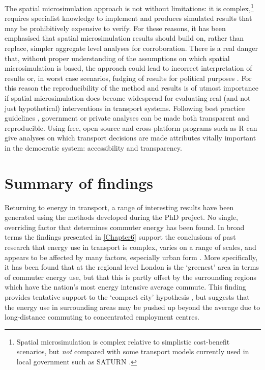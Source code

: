 The spatial microsimulation approach is not without limitations:
it is complex,\footnote{Spatial
microsimulation is complex relative to
simplistic cost-benefit scenarios, but \emph{not}
compared with some transport models currently used in local government such as
SATURN \citep{SATURN2012}.
}
requires specialist knowledge to implement and produces simulated results that
may be prohibitively expensive to verify. For these reasons, it has been
emphasised that spatial microsimulation results should build on, rather than
replace, simpler aggregate level analyses for corroboration. There is a real
danger that, without proper understanding of the assumptions on which spatial
microsimulation is based, the approach could lead to incorrect interpretation
of results or, in worst case scenarios, fudging of results for political
purposes \citep{Openshaw1978}.
For this reason the reproducibility of the method and results is of utmost
importance if spatial microsimulation does
become widespread for evaluating real (and not just hypothetical)
interventions in transport systems. Following best practice guidelines
\citep{Peng2006}, government or private analyses can be made both transparent
and reproducible. Using free, open source and cross-platform programs such as R
can give analyses on which transport decisions are made attributes
vitally important in the democratic system: accessibility and transparency.

\section{Summary of findings} \label{sumfind}
Returning to energy in transport, a range of interesting results have been
generated using the methods developed during the PhD project.
No single,
overriding factor that determines commuter energy has been found. In broad
terms the findings presented in \cref{Chapter6}
support the conclusions of past research that energy use in transport is
complex, varies on a range of scales, and appears to be affected by many
factors, especially urban form \citep{Levtnson1997, smith2011polycentricity,
Levinson2012}.
More specifically, it has been found that at the regional level London
is the `greenest' area in terms of commuter energy use, but that this is
partly offset by the surrounding regions which have the nation's most
energy intensive average commute. This finding provides tentative support
to the `compact city' hypothesis \citep{Breheny1995}, but suggests that
the energy use in surrounding areas may be pushed up beyond the average
due to long-distance commuting to concentrated employment centres.


